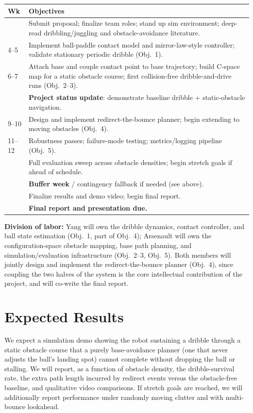 \documentclass[10pt,twocolumn]{article}
\begin{document}
\begin{table}[h]
\centering
\small
\setlength{\tabcolsep}{4pt}
\begin{tabular}{@{}>{\raggedright\arraybackslash}p{1.05cm}p{6.35cm}@{}}
\toprule
\textbf{Wk} & \textbf{Objectives} \\
\midrule
3 & Submit proposal; finalize team roles; stand up sim environment; deep-read dribbling/juggling and obstacle-avoidance literature. \\
\mbox{4--5} & Implement ball-paddle contact model and mirror-law-style controller; validate stationary periodic dribble (Obj.~1). \\
\mbox{6--7} & Attach base and couple contact point to base trajectory; build C-space map for a static obstacle course; first collision-free dribble-and-drive runs (Obj.~2--3). \\
8 & \textbf{Project status update}: demonstrate baseline dribble + static-obstacle navigation. \\
\mbox{9--10} & Design and implement redirect-the-bounce planner; begin extending to moving obstacles (Obj.~4). \\
\mbox{11--12} & Robustness passes; failure-mode testing; metrics/logging pipeline (Obj.~5). \\
13 & Full evaluation sweep across obstacle densities; begin stretch goals if ahead of schedule. \\
14 & \textbf{Buffer week} / contingency fallback if needed (see above). \\
15 & Finalize results and demo video; begin final report. \\
16 & \textbf{Final report and presentation due.} \\
\bottomrule
\end{tabular}
\end{table}

\noindent\textbf{Division of labor:} Yang will own the dribble dynamics,
contact controller, and ball state estimation (Obj.~1, part of Obj.~4);
Arsenault will own the configuration-space obstacle mapping, base path
planning, and simulation/evaluation infrastructure (Obj.~2--3, Obj.~5).
Both members will jointly design and implement the redirect-the-bounce
planner (Obj.~4), since coupling the two halves of the system is the core
intellectual contribution of the project, and will co-write the final
report.

\section{Expected Results}
We expect a simulation demo showing the robot sustaining a dribble through
a static obstacle course that a purely base-avoidance planner (one that
never adjusts the ball's landing spot) cannot complete without dropping the
ball or stalling. We will report, as a function of obstacle density, the
dribble-survival rate, the extra path length incurred by redirect events
versus the obstacle-free baseline, and qualitative video comparisons. If
stretch goals are reached, we will additionally report performance under
randomly moving clutter and with multi-bounce lookahead.
\end{document}
